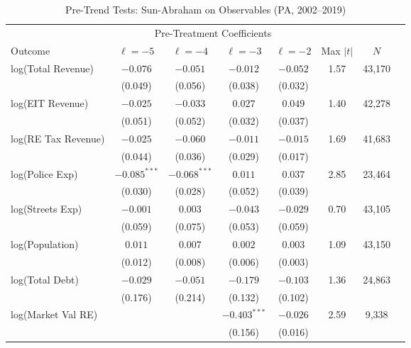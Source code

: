 \documentclass[12pt]{article}
\begin{document}
\begin{table}[H]
    \centering
    \caption{Pre-Trend Tests: Sun-Abraham on Observables (PA, 2002--2019)}
    \label{tab:pretrends}
    \small
    \begin{tabular}{lccccccc}
        \toprule
        & \multicolumn{4}{c}{Pre-Treatment Coefficients} & & \\
        \cmidrule(lr){2-5}
        Outcome & $\ell = -5$ & $\ell = -4$ & $\ell = -3$ & $\ell = -2$ & Max $|t|$ & $N$ \\
        \midrule
        log(Total Revenue) & $-0.076$ & $-0.051$ & $-0.012$ & $-0.052$ & 1.57 & 43{,}170 \\
                           & (0.049)  & (0.056)  & (0.038)  & (0.032)  &      &          \\[0.3em]
        log(EIT Revenue)   & $-0.025$ & $-0.033$ & $0.027$  & $0.049$  & 1.40 & 42{,}278 \\
                           & (0.051)  & (0.052)  & (0.032)  & (0.037)  &      &          \\[0.3em]
        log(RE Tax Revenue)& $-0.025$ & $-0.060$ & $-0.011$ & $-0.015$ & 1.69 & 41{,}683 \\
                           & (0.044)  & (0.036)  & (0.029)  & (0.017)  &      &          \\[0.3em]
        log(Police Exp)    & $-0.085^{***}$ & $-0.068^{***}$ & $0.011$ & $0.037$ & 2.85 & 23{,}464 \\
                           & (0.030)  & (0.028)  & (0.052)  & (0.039)  &      &          \\[0.3em]
        log(Streets Exp)   & $-0.001$ & $0.003$  & $-0.043$ & $-0.029$ & 0.70 & 43{,}105 \\
                           & (0.059)  & (0.075)  & (0.053)  & (0.059)  &      &          \\[0.3em]
        log(Population)    & $0.011$  & $0.007$  & $0.002$  & $0.003$  & 1.09 & 43{,}150 \\
                           & (0.012)  & (0.008)  & (0.006)  & (0.003)  &      &          \\[0.3em]
        log(Total Debt)    & $-0.029$ & $-0.051$ & $-0.179$ & $-0.103$ & 1.36 & 24{,}863 \\
                           & (0.176)  & (0.214)  & (0.132)  & (0.102)  &      &          \\[0.3em]
        log(Market Val RE) &          &          & $-0.403^{***}$ & $-0.026$ & 2.59 & 9{,}338 \\
                           &          &          & (0.156)  & (0.016)  &      &          \\[0.3em]

\end{tabular}
\end{table}
\end{document}

